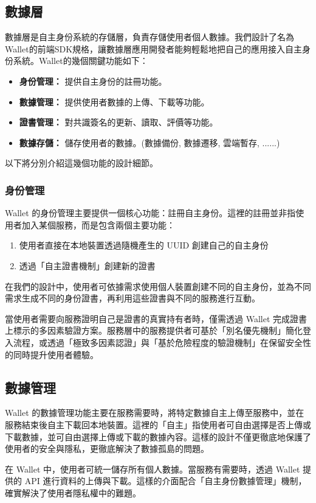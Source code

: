 \subsection{數據層}
數據層是自主身份系統的存儲層，負責存儲使用者個人數據。我們設計了名為Wallet的前端SDK規格，讓數據層應用開發者能夠輕鬆地把自己的應用接入自主身份系統。Wallet的幾個關鍵功能如下：
\begin{itemize}
  \item \textbf{身份管理：} 提供自主身份的註冊功能。
  \item \textbf{數據管理：} 提供使用者數據的上傳、下載等功能。
  \item \textbf{證書管理：} 對共識簽名的更新、讀取、評價等功能。
  \item \textbf{數據存儲：} 儲存使用者的數據。(數據備份, 數據遷移, 雲端暫存, ......)
\end{itemize}
以下將分別介紹這幾個功能的設計細節。
\subsubsection{身份管理}
Wallet 的身份管理主要提供一個核心功能：註冊自主身份。這裡的註冊並非指使用者加入某個服務，而是包含兩個主要功能：
\begin{enumerate}
  \item 使用者直接在本地裝置透過隨機產生的 UUID 創建自己的自主身份
  \item 透過「自主證書機制」創建新的證書
\end{enumerate}
在我們的設計中，使用者可依據需求使用個人裝置創建不同的自主身份，並為不同需求生成不同的身份證書，再利用這些證書與不同的服務進行互動。

當使用者需要向服務證明自己是證書的真實持有者時，僅需透過 Wallet 完成證書上標示的多因素驗證方案。服務層中的服務提供者可基於「別名優先機制」簡化登入流程，或透過「極致多因素認證」與「基於危險程度的驗證機制」在保留安全性的同時提升使用者體驗。
\subsection{數據管理}
Wallet 的數據管理功能主要在服務需要時，將特定數據自主上傳至服務中，並在服務結束後自主下載回本地裝置。這裡的「自主」指使用者可自由選擇是否上傳或下載數據，並可自由選擇上傳或下載的數據內容。這樣的設計不僅更徹底地保護了使用者的安全與隱私，更徹底解決了數據孤島的問題。

在 Wallet 中，使用者可統一儲存所有個人數據。當服務有需要時，透過 Wallet 提供的 API 進行資料的上傳與下載。這樣的介面配合「自主身份數據管理」機制，確實解決了使用者隱私權中的難題。
